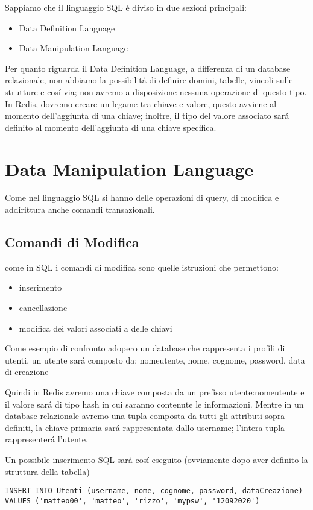 Sappiamo che il linguaggio SQL é diviso in due sezioni principali:
\begin{itemize}
    \item Data Definition Language
    \item Data Manipulation Language
\end{itemize}

Per quanto riguarda il Data Definition Language, a differenza di un database relazionale, non abbiamo la possibilitá di definire
domini, tabelle, vincoli sulle strutture e cosí via; non avremo a disposizione nessuna operazione di questo tipo.\\
In Redis, dovremo creare un legame tra chiave e valore, questo avviene al momento dell'aggiunta di una chiave; inoltre, il tipo del valore
associato sará definito al momento dell'aggiunta di una chiave specifica.
\section{Data Manipulation Language}
Come nel linguaggio SQL si hanno delle operazioni di query, di modifica e addirittura anche comandi transazionali.

\subsection{Comandi di Modifica}
come in SQL i comandi di modifica sono quelle istruzioni che permettono:
\begin{itemize}
    \item inserimento
    \item cancellazione
    \item modifica dei valori associati a delle chiavi
\end{itemize}


Come esempio di confronto adopero un database che rappresenta i profili di utenti,
un utente sará composto da: nomeutente, nome, cognome, password, data di creazione

Quindi in Redis avremo una chiave composta da un prefisso utente:nomeutente e il valore sará di tipo hash in cui saranno contenute le informazioni.
Mentre in un database relazionale avremo una tupla composta da tutti gli attributi sopra definiti, la chiave primaria sará rappresentata dallo username; l'intera tupla rappresenterá l'utente.

Un possibile inserimento SQL sará cosí eseguito (ovviamente dopo aver definito la struttura della tabella)
\begin{lstlisting}[autogobble]
INSERT INTO Utenti (username, nome, cognome, password, dataCreazione)
VALUES ('matteo00', 'matteo', 'rizzo', 'mypsw', '12092020')\end{lstlisting}

